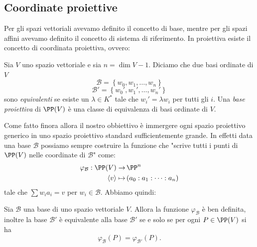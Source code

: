 \documentclass[11pt]{scrartcl}
\begin{document}
   	 \subsection{Coordinate proiettive}
   	 Per gli spazi vettoriali avevamo definito il concetto di base, mentre per gli spazi affini avevamo definito il concetto di sistema di riferimento. In proiettiva esiste il concetto di coordinata proiettiva, ovvero:
   	 \begin{definition}
   	 	Sia $V$ uno spazio vettoriale e sia $n=\dim V-1$. Diciamo che due basi ordinate di $V$
   	 	$$\mathcal{B}=\left\{w_0,w_1,\dots,w_n\right\}$$
   	 	$$\mathcal{B}'=\left\{w_0',w_1',\dots,w_n'\right\}$$
   	 	sono \textit{equivalenti} se esiste un $\lambda\in K^*$ tale che $w_i'=\lambda w_i$ per tutti gli $i$. Una \textit{base proiettiva} di $\PP(V)$ è una classe di equivalenza di basi ordinate di $V$.
   	 \end{definition}
   	 Come fatto finora allora il nostro obbiettivo è immergere ogni spazio proiettivo generico in uno spazio proiettivo standard sufficientemente grande. In effetti data una base $\mathcal{B}$ possiamo sempre costruire la funzione che "scrive tutti i punti di $\PP(V)$ nelle coordinate di $\mathcal{B}$" come:
   	 \begin{align*}
   	 	\varphi_\mathcal{B}:\PP(V)\to &\,\PP^n \\
   	 	\langle v \rangle \mapsto & \, (a_0:a_1:\dots:a_n)
   	 \end{align*}
   	 tale che $\sum w_ia_i=v$ per $w_i\in \mathcal{B}$. Abbiamo quindi:
   	 \begin{proposition}
   	 	Sia $\mathcal{B}$ una base di uno spazio vettoriale $V$. Allora la funzione $\varphi_\mathcal{B}$ è ben definita, inoltre la base $\mathcal{B}'$ è equivalente alla base $\mathcal{B}'$ se e solo se per ogni $P\in \PP(V)$ si ha
   	 	$$\varphi_\mathcal{B}(P)=\varphi_{\mathcal{B}'}(P).$$
   	 \end{proposition}
\end{document}
